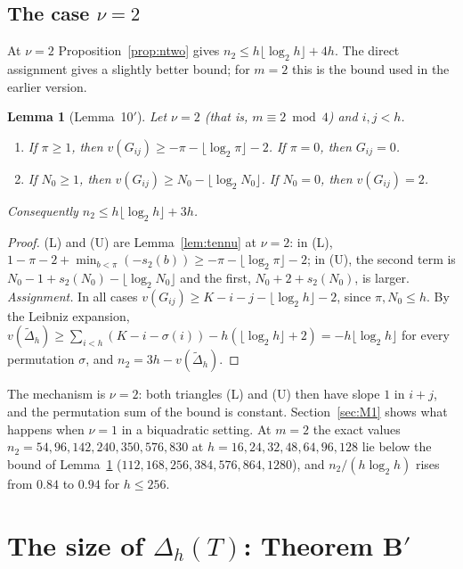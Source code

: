 \documentclass[11pt]{amsart}
\newtheorem{lemma}[theorem]{Lemma}
\theoremstyle{definition}
\theoremstyle{remark}
\numberwithin{equation}{section}
\begin{document}
\subsection{The case \texorpdfstring{$\nu=2$}{nu = 2}}
At $\nu=2$ Proposition~\ref{prop:ntwo} gives $n_2\le h\lfloor\log_2h\rfloor+4h$. The direct assignment gives a slightly
better bound; for $m=2$ this is the bound used in the earlier version.

\begin{lemma}[Lemma~10$'$]\label{lem:ten}
Let $\nu=2$ (that is, $m\equiv2\bmod4$) and $i,j<h$.
\begin{enumerate}
\item[(L)] If $\pi\ge1$, then $v(G_{ij})\ge-\pi-\lfloor\log_2\pi\rfloor-2$. If $\pi=0$, then $G_{ij}=0$.
\item[(U)] If $N_0\ge1$, then $v(G_{ij})\ge N_0-\lfloor\log_2N_0\rfloor$. If $N_0=0$, then $v(G_{ij})=2$.
\end{enumerate}
Consequently $n_2\le h\lfloor\log_2h\rfloor+3h$.
\end{lemma}

\begin{proof}
(L) and (U) are Lemma~\ref{lem:tennu} at $\nu=2$: in (L), $1-\pi-2+\min_{b<\pi}(-s_2(b))\ge-\pi-\lfloor\log_2\pi\rfloor-2$;
in (U), the second term is $N_0-1+s_2(N_0)-\lfloor\log_2N_0\rfloor$ and the first, $N_0+2+s_2(N_0)$, is larger.
\emph{Assignment.} In all cases $v(G_{ij})\ge K-i-j-\lfloor\log_2h\rfloor-2$, since $\pi,N_0\le h$. By the Leibniz
expansion, $v(\tilde\Delta_h)\ge\sum_{i<h}(K-i-\sigma(i))-h(\lfloor\log_2h\rfloor+2)=-h\lfloor\log_2h\rfloor$ for every
permutation $\sigma$, and $n_2=3h-v(\tilde\Delta_h)$.
\end{proof}

The mechanism is $\nu=2$: both triangles (L) and (U) then have slope $1$ in $i+j$, and the permutation sum of the
bound is constant. Section~\ref{sec:M1} shows what happens when $\nu=1$ in a biquadratic setting. At $m=2$ the exact values
$n_2=54,96,142,240,350,576,830$ at $h=16,24,32,48,64,96,128$ lie below the bound of Lemma~\ref{lem:ten}
($112,168,256,384,576,864,1280$), and $n_2/(h\log_2h)$ rises from $0.84$ to $0.94$ for $h\le256$.

\section{The size of \texorpdfstring{$\Delta_h(T)$}{Delta\textunderscore h(T)}: Theorem B\texorpdfstring{$'$}{'}}\label{sec:analytic}
\end{document}
